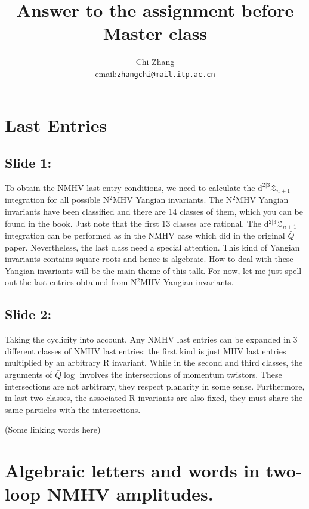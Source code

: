 \documentclass[a4paper,11pt]{article}
\title{\bf Answer to the assignment before Master class}
\author{Chi Zhang \\ email:\quad \tt{zhangchi@mail.itp.ac.cn}}
\date{}
\begin{document}
\fontsize{12}{15}
\selectfont







\section{Last Entries}

\subsection{Slide 1:}

To obtain the NMHV last entry conditions, we need to calculate the $\mathrm{d}^{2\vert 3} \mathcal{Z}_{n+1}$ integration for all possible N$^{2}$MHV Yangian invariants. The N$^{2}$MHV Yangian invariants have been classified and there are 14 classes of them, which you can be found in the book. Just note that the first 13 classes are rational. The d$^{2|3}\mathcal{Z}_{n+1}$ integration can be performed as in the NMHV case which did in the original $\bar{Q}$ paper. Nevertheless, the last class need a special attention. This kind of Yangian invariants contains square roots and hence is algebraic. How to deal with these Yangian invariants will be the main theme of this talk. For now, let me just spell out the last entries obtained from N$^{2}$MHV Yangian invariants. 

\subsection{Slide 2:}

Taking the cyclicity into account. Any NMHV last entries can be expanded in 3 different classes of NMHV last entries: the first kind is just MHV last entries multiplied by an arbitrary R invariant. While in the second and third classes, the arguments of  $\bar{Q}\log$ involves the intersections of momentum twistors. These intersections are not arbitrary, they respect planarity in some sense. Furthermore, in last two classes, the associated R invariants are also fixed, they must share the same particles with the intersections. 

(Some linking words here)


\section{ Algebraic letters and words in two-loop NMHV amplitudes.}
\end{document}
